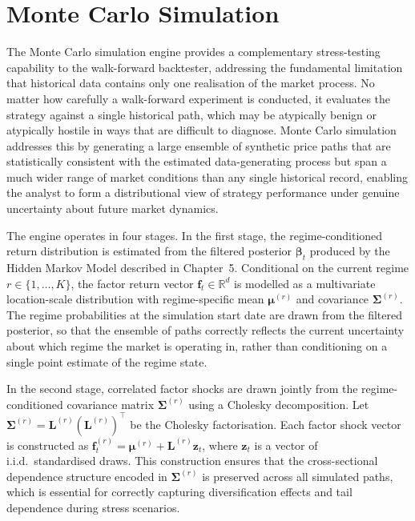 \documentclass[12pt,openany]{book}
\numberwithin{equation}{chapter}
\theoremstyle{plain}
\theoremstyle{definition}
\theoremstyle{remark}
\begin{document}
\section{Monte Carlo Simulation}

The Monte Carlo simulation engine provides a complementary stress-testing capability to the walk-forward backtester, addressing the fundamental limitation that historical data contains only one realisation of the market process. No matter how carefully a walk-forward experiment is conducted, it evaluates the strategy against a single historical path, which may be atypically benign or atypically hostile in ways that are difficult to diagnose. Monte Carlo simulation addresses this by generating a large ensemble of synthetic price paths that are statistically consistent with the estimated data-generating process but span a much wider range of market conditions than any single historical record, enabling the analyst to form a distributional view of strategy performance under genuine uncertainty about future market dynamics.

The engine operates in four stages. In the first stage, the regime-conditioned return distribution is estimated from the filtered posterior $\boldsymbol{\beta}_t$ produced by the Hidden Markov Model described in Chapter~5. Conditional on the current regime $r \in \{1, \ldots, K\}$, the factor return vector $\mathbf{f}_t \in \mathbb{R}^d$ is modelled as a multivariate location-scale distribution with regime-specific mean $\boldsymbol{\mu}^{(r)}$ and covariance $\boldsymbol{\Sigma}^{(r)}$. The regime probabilities at the simulation start date are drawn from the filtered posterior, so that the ensemble of paths correctly reflects the current uncertainty about which regime the market is operating in, rather than conditioning on a single point estimate of the regime state.

In the second stage, correlated factor shocks are drawn jointly from the regime-conditioned covariance matrix $\boldsymbol{\Sigma}^{(r)}$ using a Cholesky decomposition. Let $\boldsymbol{\Sigma}^{(r)} = \mathbf{L}^{(r)} (\mathbf{L}^{(r)})^\top$ be the Cholesky factorisation. Each factor shock vector is constructed as $\mathbf{f}_t^{(r)} = \boldsymbol{\mu}^{(r)} + \mathbf{L}^{(r)} \mathbf{z}_t$, where $\mathbf{z}_t$ is a vector of i.i.d.\ standardised draws. This construction ensures that the cross-sectional dependence structure encoded in $\boldsymbol{\Sigma}^{(r)}$ is preserved across all simulated paths, which is essential for correctly capturing diversification effects and tail dependence during stress scenarios.
\end{document}
